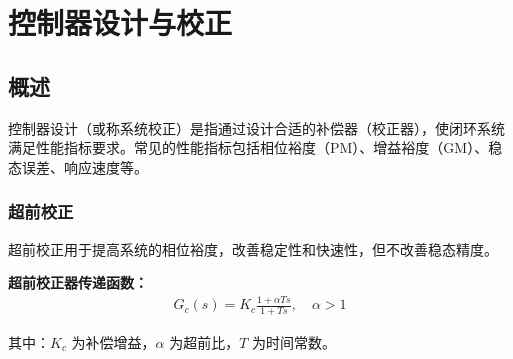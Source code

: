 \section{控制器设计与校正}

\subsection{概述}

控制器设计（或称系统校正）是指通过设计合适的补偿器（校正器），使闭环系统满足性能指标要求。常见的性能指标包括相位裕度（PM）、增益裕度（GM）、稳态误差、响应速度等。

\subsubsection{超前校正}

超前校正用于提高系统的相位裕度，改善稳定性和快速性，但不改善稳态精度。

\textbf{超前校正器传递函数：}
\begin{align*}
G_c(s) = K_c \frac{1 + \alpha T s}{1 + T s}, \quad \alpha > 1
\end{align*}

其中：$K_c$ 为补偿增益，$\alpha$ 为超前比，$T$ 为时间常数。

